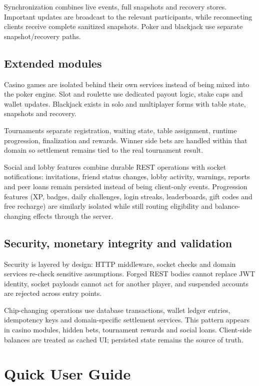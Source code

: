 \documentclass[11pt,a4paper]{article}
\begin{document}
Synchronization combines live events, full snapshots and recovery stores. Important updates are broadcast to the relevant participants, while reconnecting clients receive complete sanitized snapshots. Poker and blackjack use separate snapshot/recovery paths.

\subsection{Extended modules}

Casino games are isolated behind their own services instead of being mixed into the poker engine. Slot and roulette use dedicated payout logic, stake caps and wallet updates. Blackjack exists in solo and multiplayer forms with table state, snapshots and recovery.

Tournaments separate registration, waiting state, table assignment, runtime progression, finalization and rewards. Winner side bets are handled within that domain so settlement remains tied to the real tournament result.

Social and lobby features combine durable REST operations with socket notifications: invitations, friend status changes, lobby activity, warnings, reports and peer loans remain persisted instead of being client-only events. Progression features (XP, badges, daily challenges, login streaks, leaderboards, gift codes and free recharge) are similarly isolated while still routing eligibility and balance-changing effects through the server.

\subsection{Security, monetary integrity and validation}

Security is layered by design: HTTP middleware, socket checks and domain services re-check sensitive assumptions. Forged REST bodies cannot replace JWT identity, socket payloads cannot act for another player, and suspended accounts are rejected across entry points.

Chip-changing operations use database transactions, wallet ledger entries, idempotency keys and domain-specific settlement services. This pattern appears in casino modules, hidden bets, tournament rewards and social loans. Client-side balances are treated as cached UI; persisted state remains the source of truth.

\section{Quick User Guide}
\label{app:user-guide}
\end{document}

